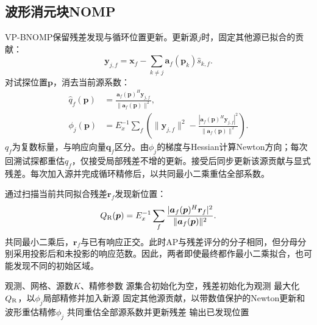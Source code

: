 \documentclass[a4paper,fleqn]{cas-sc}
\begin{document}
\subsection{波形消元块NOMP}
VP-BNOMP保留残差发现与循环位置更新\cite{Mamandipoor2016,Yang2022}。更新源$j$时，固定其他源已拟合的贡献：
\begin{equation}
\bm y_{j,f}=\bm x_f-\sum_{k\ne j}\bm a_f(\bm p_k)\widehat s_{k,f}.
\end{equation}
对试探位置$\bm p$，消去当前源系数：
\begin{align}
\widehat q_f(\bm p)&=\frac{\bm a_f(\bm p)^H\bm y_{j,f}}{\|\bm a_f(\bm p)\|^2},\\
\phi_j(\bm p)&=E_x^{-1}\sum_f\left(\|\bm y_{j,f}\|^2-
 \frac{|\bm a_f(\bm p)^H\bm y_{j,f}|^2}{\|\bm a_f(\bm p)\|^2}\right).
\label{en:local}
\end{align}
$q_f$为复数标量，与响应向量$\bm q_f$区分。由$\phi_j$的梯度与Hessian计算Newton方向；每次回溯试探都重估$q_f$，仅接受局部残差不增的更新。接受后同步更新该源贡献与显式残差。每次加入源并完成循环精修后，以共同最小二乘重估全部系数。

通过扫描当前共同拟合残差$\bm r_f$发现新位置：
\begin{equation}
Q_{\rm R}(\bm p)=E_x^{-1}\sum_f
 \frac{|\bm a_f(\bm p)^H\bm r_f|^2}{\|\bm a_f(\bm p)\|^2}.
\end{equation}
共同最小二乘后，$\bm r_f$与已有响应正交。此时AP与残差评分的分子相同，但分母分别采用投影后和未投影的响应范数。因此，两者即使最终都作最小二乘拟合，也可能发现不同的初始区域。

\begin{algorithm}[H]
\caption{VP-BNOMP}\label{en:algnomp}
\begin{algorithmic}[1]
\Require 观测、网格、源数$K$、精修参数
\State 源集合初始化为空，残差初始化为观测
\State 最大化$Q_{\rm R}$，以$\phi_j$局部精修并加入新源
\Repeat
{}
\State 固定其他源贡献，以带数值保护的Newton更新和波形重估精修$\phi_j$
\EndFor
{}
\State 共同重估全部源系数并更新残差
\EndFor
\State 输出已发现位置
\end{algorithmic}
\end{algorithm}

\FloatBarrier
\end{document}
